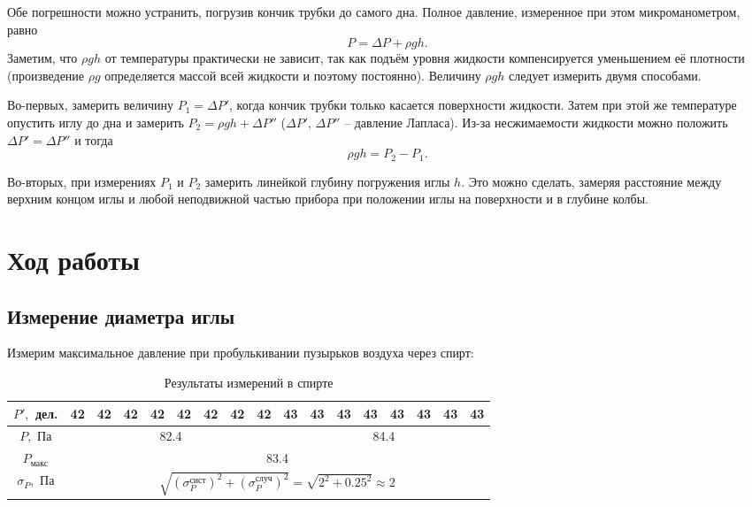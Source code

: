 \documentclass[a4paper,12pt]{article}
\theoremstyle{definition}
\begin{document}
	Обе погрешности можно устранить, погрузив кончик трубки до самого дна. Полное давление, измеренное при этом микроманометром, равно \[ P = \Delta P + \rho g h.\] Заметим, что $ \rho gh $ от температуры практически не зависит, так как подъём уровня жидкости компенсируется уменьшением её плотности (произведение $ \rho g $ определяется массой всей жидкости и поэтому постоянно). Величину  $ \rho g h $ следует измерить двумя способами.
	
	Во-первых, замерить величину $ P_1= \Delta P' $, когда кончик трубки только касается поверхности жидкости. Затем при этой же температуре опустить иглу до дна и замерить $ P_2= \rho gh + \Delta P'' $ ($ \Delta P' $, $ \Delta P'' $ -- давление Лапласа). Из-за  несжимаемости  жидкости можно положить $ \Delta P' = \Delta P'' $ и тогда \[ \rho gh= P_2 - P_1. \]
	
	Во-вторых, при измерениях $ P_1 $ и $ P_2 $ замерить линейкой  глубину погружения иглы $ h $. Это можно сделать, замеряя расстояние между верхним концом иглы и любой неподвижной частью прибора при положении иглы на поверхности и в глубине колбы.
	
	\section{Ход работы}
	\subsection{Измерение диаметра иглы}
	Измерим максимальное давление при пробулькивании пузырьков воздуха через спирт:
	\bgroup
	\def\arraystretch{1.7}%
	\begin{table}[H]
		\begin{center}
			\begin{tabular}{|c|c|c|c|c|c|c|c|c|c|c|c|c|c|c|c|c|}
				\hline
				$P',$ дел. &42&42&42&42&42&42&42&42&43&43&43&43&43&43&43&43\\
				\hline
				$P,$ Па& \multicolumn{8}{c|}{82.4}&\multicolumn{8}{c|}{84.4}\\
				\hline
				$P_{\text{макс}}$& \multicolumn{16}{c|}{83.4}\\
				\hline
				$\sigma_P,$ Па&\multicolumn{16}{c|}{$\sqrt{\left(\sigma_P^\text{сист}\right)^2 + \left(\sigma_P^\text{случ}\right)^2} = \sqrt{2^2 + 0.25^2} \approx 2$}\\
				\hline
			\end{tabular}
		\end{center}
		\caption{Результаты измерений в спирте}
		\label{tab1}
	\end{table}
	\egroup
	
\end{document}
